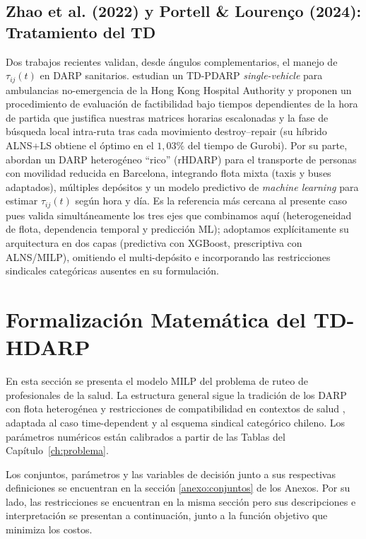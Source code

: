 \subsection{Zhao et al. (2022) y Portell \& Lourenço (2024): Tratamiento del TD}
Dos trabajos recientes validan, desde ángulos complementarios, el manejo de $\tau_{ij}(t)$ en DARP sanitarios. \cite{Zhao2022} estudian un TD-PDARP \textit{single-vehicle} para ambulancias no-emergencia de la Hong Kong Hospital Authority y proponen un procedimiento de evaluación de factibilidad bajo tiempos dependientes de la hora de partida que justifica nuestras matrices horarias escalonadas y la fase de búsqueda local intra-ruta tras cada movimiento destroy--repair (su híbrido ALNS+LS obtiene el óptimo en el $1{,}03\%$ del tiempo de Gurobi). Por su parte, \cite{Portell2024} abordan un DARP heterogéneo ``rico'' (rHDARP) para el transporte de personas con movilidad reducida en Barcelona, integrando flota mixta (taxis y buses adaptados), múltiples depósitos y un modelo predictivo de \textit{machine learning} para estimar $\tau_{ij}(t)$ según hora y día. Es la referencia más cercana al presente caso pues valida simultáneamente los tres ejes que combinamos aquí (heterogeneidad de flota, dependencia temporal y predicción ML); adoptamos explícitamente su arquitectura en dos capas (predictiva con XGBoost, prescriptiva con ALNS/MILP), omitiendo el multi-depósito e incorporando las restricciones sindicales categóricas ausentes en su formulación.

\section{Formalización Matemática del TD-HDARP}
\label{sec:milp}

En esta sección se presenta el modelo MILP del problema de ruteo de profesionales de la salud. La estructura general sigue la tradición de los DARP con flota heterogénea y restricciones de compatibilidad en contextos de salud \cite{Detti2017}, adaptada al caso time-dependent y al esquema sindical categórico chileno. Los parámetros numéricos están calibrados a partir de las Tablas del Capítulo~\ref{ch:problema}.

Los conjuntos, parámetros y las variables de decisión junto a sus respectivas definiciones se encuentran en la sección \ref{anexo:conjuntos} de los Anexos. Por su lado, las restricciones se encuentran en la misma sección pero sus descripciones e interpretación se presentan a continuación, junto a la función objetivo que minimiza los costos.


